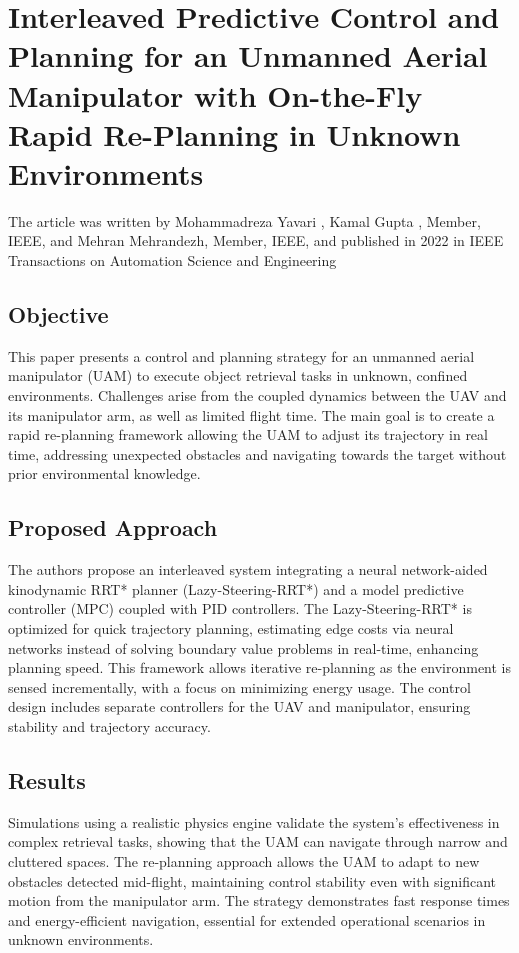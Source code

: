\documentclass[a4paper,12pt]{article}
\begin{document}
\section{Interleaved Predictive Control and Planning for an Unmanned Aerial Manipulator with On-the-Fly Rapid Re-Planning in Unknown Environments}

The article\cite{yavari2022interleaved} was written by Mohammadreza Yavari , Kamal Gupta , Member, IEEE, and Mehran Mehrandezh, Member, IEEE, and published in 2022 in IEEE Transactions on Automation Science and Engineering

\subsection{Objective}
This paper presents a control and planning strategy for an unmanned aerial manipulator (UAM) to execute object retrieval tasks in unknown, confined environments. Challenges arise from the coupled dynamics between the UAV and its manipulator arm, as well as limited flight time. The main goal is to create a rapid re-planning framework allowing the UAM to adjust its trajectory in real time, addressing unexpected obstacles and navigating towards the target without prior environmental knowledge.

\subsection{Proposed Approach}
The authors propose an interleaved system integrating a neural network-aided kinodynamic RRT* planner (Lazy-Steering-RRT*) and a model predictive controller (MPC) coupled with PID controllers. The Lazy-Steering-RRT* is optimized for quick trajectory planning, estimating edge costs via neural networks instead of solving boundary value problems in real-time, enhancing planning speed. This framework allows iterative re-planning as the environment is sensed incrementally, with a focus on minimizing energy usage. The control design includes separate controllers for the UAV and manipulator, ensuring stability and trajectory accuracy.

\subsection{Results}
Simulations using a realistic physics engine validate the system's effectiveness in complex retrieval tasks, showing that the UAM can navigate through narrow and cluttered spaces. The re-planning approach allows the UAM to adapt to new obstacles detected mid-flight, maintaining control stability even with significant motion from the manipulator arm. The strategy demonstrates fast response times and energy-efficient navigation, essential for extended operational scenarios in unknown environments.
\end{document}
